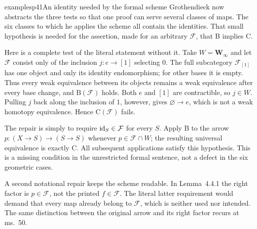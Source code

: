 \begin{dcomment}{examples}{p41}{An identity needed by the formal scheme}
Grothendieck now abstracts the three tests so that one proof can serve several classes of maps. The six classes to which he applies the scheme all contain the identities. That small hypothesis is needed for the assertion, made for an arbitrary $\mathcal F$, that B implies C.

Here is a complete test of the literal statement without it. Take $W=\mathbf W_\infty$ and let $\mathcal F$ consist only of the inclusion $j:e\to[1]$ selecting $0$. The full subcategory $\mathcal F_{[1]}$ has one object and only its identity endomorphism; for other bases it is empty. Thus every weak equivalence between its objects remains a weak equivalence after every base change, and $\mathrm B(\mathcal F)$ holds. Both $e$ and $[1]$ are contractible, so $j\in W$. Pulling $j$ back along the inclusion of $1$, however, gives $\varnothing\to e$, which is not a weak homotopy equivalence. Hence $\mathrm C(\mathcal F)$ fails.

The repair is simply to require $\mathrm{id}_S\in\mathcal F$ for every $S$. Apply B to the arrow $p:(X\to S)\to(S\to S)$ whenever $p\in\mathcal F\cap W$; the resulting universal equivalence is exactly C. All subsequent applications satisfy this hypothesis. This is a missing condition in the unrestricted formal sentence, not a defect in the six geometric cases.

A second notational repair keeps the scheme readable. In Lemma~4.4.1 the right factor is $p\in\mathcal F$, not the printed $f\in\mathcal F$. The literal latter requirement would demand that every map already belong to $\mathcal F$, which is neither used nor intended. The same distinction between the original arrow and its right factor recurs at ms.~50.
\end{dcomment}


